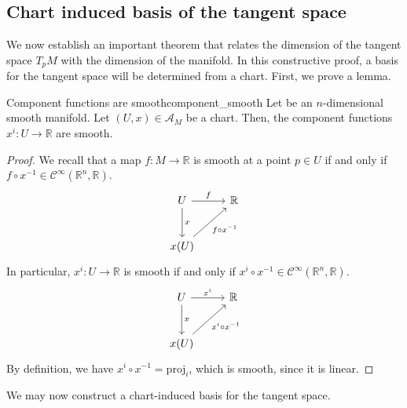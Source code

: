 \subsection{Chart induced basis of the tangent space}

We now establish an important theorem that relates the dimension of the tangent space \(T_pM\) with the dimension of the manifold. In this constructive proof, a basis for the tangent space will be determined from a chart. First, we prove a lemma.

\begin{lemma}{Component functions are smooth}{component_smooth}
    Let  be an \(n\)-dimensional smooth manifold. Let \((U, x) \in \mathscr{A}_M\) be a chart. Then, the component functions \(x^i : U \to \mathbb{R}\) are smooth.
\end{lemma}
\begin{proof}
    We recall that a map \(f : M \to \mathbb{R}\) is smooth at a point \(p \in U\) if and only if \(f \circ x^{-1} \in \mathcal{C}^\infty (\mathbb{R}^n, \mathbb{R})\).
    \begin{equation*}
        \begin{tikzcd}[column sep = normal, row sep = large]
            U \arrow{r}{f} \arrow{d}{x} & \mathbb{R}\\
            x(U) \arrow[swap]{ur}{f \circ x^{-1}} &
        \end{tikzcd}
    \end{equation*}
    In particular, \(x^i : U \to \mathbb{R}\) is smooth if and only if \(x^i \circ x^{-1} \in \mathcal{C}^\infty(\mathbb{R}^n, \mathbb{R}).\)
    \begin{equation*}
        \begin{tikzcd}[column sep = normal, row sep = large]
            U \arrow{r}{x^i} \arrow{d}{x} & \mathbb{R}\\
            x(U) \arrow[swap]{ur}{x^i \circ x^{-1}} &
        \end{tikzcd}
    \end{equation*}
    By definition, we have \(x^i \circ x^{-1} = \mathrm{proj}_i\), which is smooth, since it is linear.
\end{proof}

We may now construct a chart-induced basis for the tangent space.

